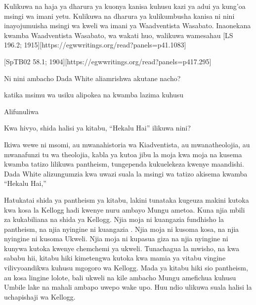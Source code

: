 Kulikuwa na haja ya dharura ya kuonya kanisa kuhusu kazi ya adui ya kung'oa msingi wa imani yetu. Kulikuwa na dharura ya kulikumbusha kanisa ni nini inayojumuisha msingi wa kweli wa imani ya Waadventista Wasabato. Inaonekana kwamba Waadventista Wasabato, wa wakati huo, walikuwa wamesahau [LS 196.2; 1915][https://egwwritings.org/read?panels=p41.1083]

[SpTB02 58.1; 1904][https://egwwritings.org/read?panels=p417.295]

Ni nini ambacho Dada White aliamrishwa akutane nacho?

 katika msimu wa usiku alipokea  na kwamba lazima  kuhusu 

Alifunuliwa 

Kwa hivyo, shida halisi ya kitabu, “Hekalu Hai” ilikuwa nini?

Ikiwa wewe ni msomi, au mwanahistoria wa Kiadventista, au mwanatheolojia, au mwanafunzi tu wa theolojia, kabla ya kutoa jibu la moja kwa moja na kusema kwamba tatizo lilikuwa pantheism, tungependa kukuelekeza kwenye maandishi. Dada White alizungumzia kwa uwazi suala la msingi wa tatizo akisema kwamba “Hekalu Hai,” 

Hatukatai shida ya pantheism ya kitabu, lakini tunataka kugeuza makini kutoka kwa kosa la Kellogg hadi kwenye nuru ambayo Mungu ametoa. Kuna njia mbili za kukabiliana na shida ya Kellogg. Njia moja ni kuangazia fundhisho la pantheism, na njia nyingine ni kuangazia . Njia moja ni kusoma kosa, na njia nyingine ni kusoma Ukweli. Njia moja ni kupasua giza na njia nyingine ni kunywa kutoka kwenye chemchemi ya ukweli. Tunachagua la mwisho, na kwa sababu hii, kitabu hiki kimetengwa kutoka kwa mamia ya vitabu vingine vilivyoandikwa kuhusu mgogoro wa Kellogg. Mada ya kitabu hiki sio pantheism, au kosa lingine lolote, bali ukweli na kile ambacho Mungu amefichua kuhusu Umbile lake na mahali ambapo uwepo wake upo. Huu ndio ulikuwa suala halisi la uchapishaji wa Kellogg.


